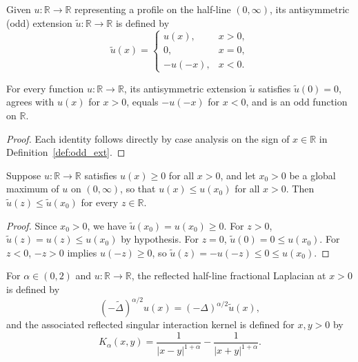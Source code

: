 \begin{definition}\label{def:odd_ext}
\leanok
Given $u : \mathbb{R} \to \mathbb{R}$ representing a profile on the half-line $(0, \infty)$, its antisymmetric (odd) extension $\widetilde{u} : \mathbb{R} \to \mathbb{R}$ is defined by
\[
  \widetilde{u}(x) =
  \begin{cases}
    u(x), & x > 0, \\
    0, & x = 0, \\
    -u(-x), & x < 0.
  \end{cases}
\]
\end{definition}

\begin{lemma}\label{lem:odd_ext_basic}
\leanok
For every function $u : \mathbb{R} \to \mathbb{R}$, its antisymmetric extension $\widetilde{u}$ satisfies $\widetilde{u}(0) = 0$, agrees with $u(x)$ for $x > 0$, equals $-u(-x)$ for $x < 0$, and is an odd function on $\mathbb{R}$.
\end{lemma}

\begin{proof}
\leanok
Each identity follows directly by case analysis on the sign of $x \in \mathbb{R}$ in Definition~\ref{def:odd_ext}.
\end{proof}

\begin{lemma}\label{lem:odd_ext_max}
\leanok
Suppose $u : \mathbb{R} \to \mathbb{R}$ satisfies $u(x) \ge 0$ for all $x > 0$, and let $x_0 > 0$ be a global maximum of $u$ on $(0, \infty)$, so that $u(x) \le u(x_0)$ for all $x > 0$. Then $\widetilde{u}(z) \le \widetilde{u}(x_0)$ for every $z \in \mathbb{R}$.
\end{lemma}

\begin{proof}
\leanok
Since $x_0 > 0$, we have $\widetilde{u}(x_0) = u(x_0) \ge 0$. For $z > 0$, $\widetilde{u}(z) = u(z) \le u(x_0)$ by hypothesis. For $z = 0$, $\widetilde{u}(0) = 0 \le u(x_0)$. For $z < 0$, $-z > 0$ implies $u(-z) \ge 0$, so $\widetilde{u}(z) = -u(-z) \le 0 \le u(x_0)$.
\end{proof}

\begin{definition}\label{def:reflected_frac_lap}
\leanok
For $\alpha \in (0, 2)$ and $u : \mathbb{R} \to \mathbb{R}$, the reflected half-line fractional Laplacian at $x > 0$ is defined by
\[
  (-\widetilde{\Delta})^{\alpha/2} u(x) = (-\Delta)^{\alpha/2} \widetilde{u}(x),
\]
and the associated reflected singular interaction kernel is defined for $x, y > 0$ by
\[
  K_\alpha(x, y) = \frac{1}{\lvert x - y \rvert^{1 + \alpha}} - \frac{1}{\lvert x + y \rvert^{1 + \alpha}}.
\]
\end{definition}


